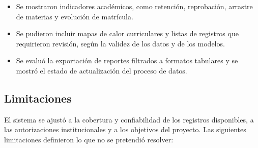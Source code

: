 \documentclass[11pt,oneside,openany]{book}
\begin{document}
\begin{itemize}[leftmargin=*]
\item Se mostraron indicadores académicos, como retención, reprobación, arrastre de materias y evolución de matrícula.
\item Se pudieron incluir mapas de calor curriculares y listas de registros que requirieron revisión, según la validez de los datos y de los modelos.
\item Se evaluó la exportación de reportes filtrados a formatos tabulares y se mostró el estado de actualización del proceso de datos.
\end{itemize}
\subsection*{Limitaciones}

El sistema se ajustó a la cobertura y confiabilidad de los registros disponibles, a las autorizaciones institucionales y a los objetivos del proyecto. Las siguientes limitaciones definieron lo que no se pretendió resolver:
\end{document}
